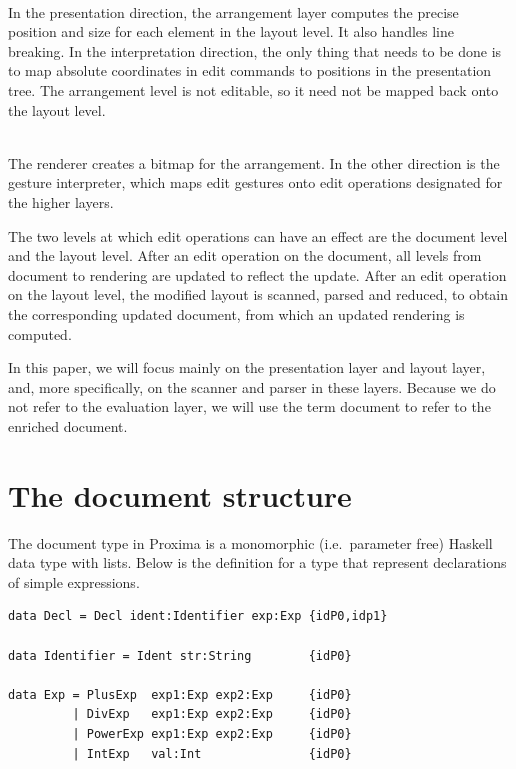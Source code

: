 \documentclass[12pt]{article}
\begin{document}
\\
In the presentation direction, the arrangement layer computes the precise position and size for each element in the layout level. It also handles line breaking. In the interpretation direction, the only thing that needs to be done is to map absolute coordinates in edit commands to positions in the presentation tree. The arrangement level is not editable, so it need not be mapped back onto the layout level.

\\
The renderer creates a bitmap for the arrangement. In the other direction is the gesture interpreter, which maps edit gestures onto edit operations designated for the higher layers.


The two levels at which edit operations can have an effect are the document level and the layout level. After an edit operation on the document, all levels from document to rendering are updated to reflect the update. After an edit operation on the layout level, the modified layout is scanned, parsed and reduced, to obtain the corresponding updated document, from which an updated rendering is computed.

In this paper, we will focus mainly on the presentation layer and layout layer, and, more specifically, on the scanner and parser in these layers. Because we do not refer to the evaluation layer, we will use the term document to refer to the enriched document.




%
\section{The document structure}\label{sect:documentStructure}
%

The document type in Proxima is a monomorphic (i.e.\ parameter free) Haskell data type with lists. Below is the definition for a type  that represent declarations of simple expressions. 

\begin{footnotesize}
\begin{verbatim}
data Decl = Decl ident:Identifier exp:Exp {idP0,idp1}

data Identifier = Ident str:String        {idP0}

data Exp = PlusExp  exp1:Exp exp2:Exp     {idP0}
         | DivExp   exp1:Exp exp2:Exp     {idP0}
         | PowerExp exp1:Exp exp2:Exp     {idP0}
         | IntExp   val:Int               {idP0}
\end{verbatim}
\end{footnotesize}
\end{document}
